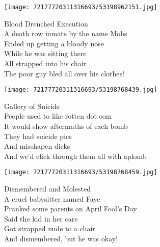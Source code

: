 \documentclass[10pt,letterpaper]{article}
\begin{document}
\begin{center}
\texttt{[image: 72177720311316693/53198962151.jpg]}
\end{center}

\begin{center}
Blood Drenched Execution\\
\vskip 0.2in
A death row inmate by the name Mohs\\
Ended up getting a bloody nose\\
While he was sitting there\\
All strapped into his chair\\
The poor guy bled all over his clothes!\\
\end{center}
\pagebreak

\begin{center}
\texttt{[image: 72177720311316693/53198768439.jpg]}
\end{center}

\begin{center}
Gallery of Suicide\\
\vskip 0.2in
People used to like rotten dot com\\
It would show aftermaths of each bomb\\
They had suicide pics\\
And misshapen dicks\\
And we'd click through them all with aplomb\\
\end{center}
\pagebreak

\begin{center}
\texttt{[image: 72177720311316693/53198768459.jpg]}
\end{center}

\begin{center}
Dismembered and Molested\\
\vskip 0.2in
A cruel babysitter named Faye\\
Pranked some parents on April Fool's Day\\
Said the kid in her care\\
Got strapped nude to a chair\\
And dismembered, but he was okay!\\
\end{center}
\pagebreak
\end{document}
